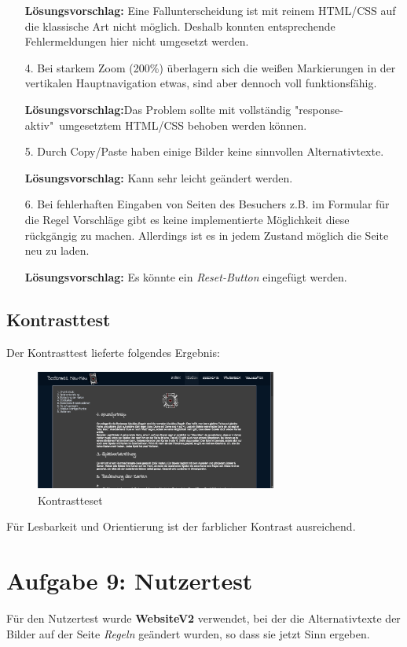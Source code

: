 \documentclass{scrartcl}
\begin{document}
\begin{itemize}
\textbf{Lösungsvorschlag:} Eine Fallunterscheidung ist mit reinem HTML/CSS auf die klassische Art nicht möglich. Deshalb konnten entsprechende Fehlermeldungen hier nicht umgesetzt werden.

\item[4.] Bei starkem Zoom (200\%) überlagern sich die weißen Markierungen in der vertikalen Hauptnavigation etwas, sind aber dennoch voll funktionsfähig. 

\textbf{Lösungsvorschlag:}Das Problem sollte mit vollständig "response-aktiv"\ umgesetztem HTML/CSS behoben werden können.

\item[5.]Durch Copy/Paste haben einige Bilder keine sinnvollen Alternativtexte.

\textbf{Lösungsvorschlag:} Kann sehr leicht geändert werden.

\item[6.] Bei fehlerhaften Eingaben von Seiten des Besuchers z.B. im Formular für die Regel Vorschläge gibt es keine implementierte Möglichkeit diese rückgängig zu machen. Allerdings ist es in jedem Zustand möglich die Seite neu zu laden.

\textbf{Lösungsvorschlag:} Es könnte ein \textit{Reset-Button} eingefügt werden. 
\end{itemize}
\subsection*{Kontrasttest}

Der Kontrasttest lieferte folgendes Ergebnis:
\begin{figure}[H]
 \centering
   \includegraphics[width=300px, height=150px]{contrast.png}
\caption{Kontrastteset}
\end{figure}


Für Lesbarkeit und Orientierung ist der farblicher Kontrast ausreichend.



\section*{Aufgabe 9: Nutzertest}
Für den Nutzertest wurde \textbf{WebsiteV2} verwendet, bei der die Alternativtexte der Bilder auf der Seite \textit{Regeln} geändert wurden, so dass sie jetzt Sinn ergeben.
\end{document}
